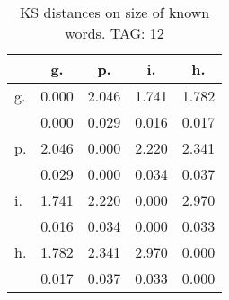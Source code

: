 \begin{table}[h!]
\begin{center}
\begin{tabular}{| l | c | c | c | c |}\hline
 & g. & p. & i. & h. \\\hline
g. & 0.000  & 2.046  & 1.741  & 1.782 \\\hline
 & 0.000  & 0.029  & 0.016  & 0.017 \\\hline
p. & 2.046  & 0.000  & 2.220  & 2.341 \\\hline
 & 0.029  & 0.000  & 0.034  & 0.037 \\\hline
i. & 1.741  & 2.220  & 0.000  & 2.970 \\\hline
 & 0.016  & 0.034  & 0.000  & 0.033 \\\hline
h. & 1.782  & 2.341  & 2.970  & 0.000 \\\hline
 & 0.017  & 0.037  & 0.033  & 0.000 \\\hline
\end{tabular}
\caption{KS distances on size of known words. TAG: 12}
\end{center}
\end{table}